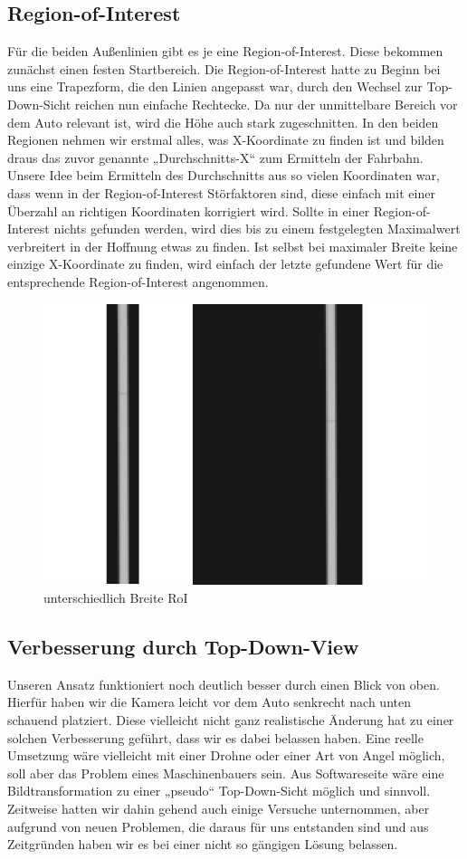\subsection{Region-of-Interest}
Für die beiden Außenlinien gibt es je eine Region-of-Interest. Diese bekommen zunächst einen festen Startbereich. Die Region-of-Interest hatte zu Beginn bei uns eine Trapezform, die den  Linien angepasst war, durch den Wechsel zur Top-Down-Sicht reichen nun einfache Rechtecke. Da nur der unmittelbare Bereich vor dem Auto relevant ist, wird die Höhe auch stark zugeschnitten. In den beiden Regionen nehmen wir erstmal alles, was X-Koordinate zu finden ist und bilden draus das zuvor genannte „Durchschnitts-X“ zum Ermitteln der Fahrbahn. Unsere Idee beim Ermitteln des Durchschnitts aus so vielen Koordinaten war, dass wenn in der Region-of-Interest Störfaktoren sind, diese einfach mit einer Überzahl an richtigen Koordinaten korrigiert wird. Sollte in einer Region-of-Interest nichts gefunden werden, wird dies bis zu einem festgelegten Maximalwert verbreitert in der Hoffnung etwas zu finden. Ist selbst bei maximaler Breite keine einzige X-Koordinate zu finden, wird einfach der letzte gefundene Wert für die entsprechende Region-of-Interest angenommen.

\begin{figure}[H]
	\centering	
	\includegraphics[width=.4\textwidth]{img/roi_breite}
	\caption[unterschiedlich Breite RoI]{unterschiedlich Breite RoI}
	\label{fig:vector_kurve}
\end{figure}

\subsection{Verbesserung durch Top-Down-View}
Unseren Ansatz funktioniert noch deutlich besser durch einen Blick von oben. Hierfür haben wir die Kamera leicht vor dem Auto senkrecht nach unten schauend platziert. Diese vielleicht nicht ganz realistische Änderung hat zu einer solchen Verbesserung geführt, dass wir es dabei belassen haben. Eine reelle Umsetzung wäre vielleicht mit einer Drohne oder einer Art von Angel möglich, soll aber das Problem eines Maschinenbauers sein. Aus Softwareseite wäre eine Bildtransformation zu einer „pseudo“ Top-Down-Sicht möglich und sinnvoll. Zeitweise hatten wir dahin gehend auch einige Versuche unternommen, aber aufgrund von neuen Problemen, die daraus für uns entstanden sind und aus Zeitgründen haben wir es bei einer nicht so gängigen Lösung belassen.

